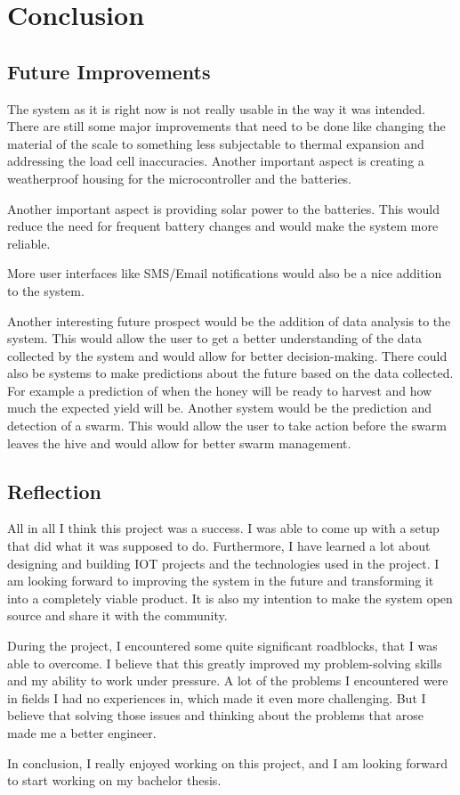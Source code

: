  \newpage
\section{Conclusion}
\subsection{Future Improvements}
The system as it is right now is not really usable in the way it was intended. There are still some major improvements that need to be done like changing the material of the scale to something less subjectable to thermal expansion and addressing the load cell inaccuracies. Another important aspect is creating a weatherproof housing for the microcontroller and the batteries.

Another important aspect is providing solar power to the batteries. This would reduce the need for frequent battery changes and would make the system more reliable.

More user interfaces like SMS/Email notifications would also be a nice addition to the system.

Another interesting future prospect would be the addition of data analysis to the system. This would allow the user to get a better understanding of the data collected by the system and would allow for better decision-making. There could also be systems to make predictions about the future based on the data collected. For example a prediction of when the honey will be ready to harvest and how much the expected yield will be. Another system would be the prediction and detection of a swarm. This would allow the user to take action before the swarm leaves the hive and would allow for better swarm management.

\newpage
\subsection{Reflection}
All in all I think this project was a success. I was able to come up with a setup that did what it was supposed to do. Furthermore, I have learned a lot about designing and building IOT projects and the technologies used in the project. I am looking forward to improving the system in the future and transforming it into a completely viable product. It is also my intention to make the system open source and share it with the community.

During the project, I encountered some quite significant roadblocks, that I was able to overcome. I believe that this greatly improved my problem-solving skills and my ability to work under pressure. A lot of the problems I encountered were in fields I had no experiences in, which made it even more challenging. But I believe that solving those issues and thinking about the problems that arose made me a better engineer.

In conclusion, I really enjoyed working on this project, and I am looking forward to start working on my bachelor thesis.
